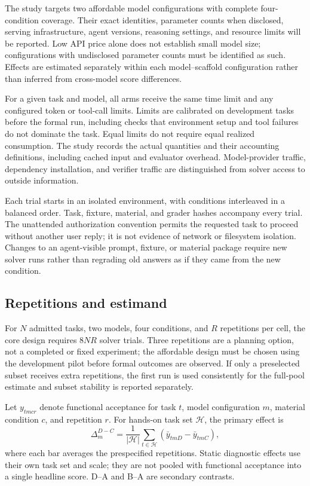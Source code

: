 \documentclass[11pt]{article}
\begin{document}
The study targets two affordable model configurations with complete four-condition coverage.
Their exact identities, parameter counts when disclosed, serving infrastructure, agent versions, reasoning settings, and resource limits will be reported.
Low API price alone does not establish small model size; configurations with undisclosed parameter counts must be identified as such.
Effects are estimated separately within each model--scaffold configuration rather than inferred from cross-model score differences.

For a given task and model, all arms receive the same time limit and any configured token or tool-call limits.
Limits are calibrated on development tasks before the formal run, including checks that environment setup and tool failures do not dominate the task.
Equal limits do not require equal realized consumption.
The study records the actual quantities and their accounting definitions, including cached input and evaluator overhead.
Model-provider traffic, dependency installation, and verifier traffic are distinguished from solver access to outside information.

Each trial starts in an isolated environment, with conditions interleaved in a balanced order.
Task, fixture, material, and grader hashes accompany every trial.
The unattended authorization convention permits the requested task to proceed without another user reply; it is not evidence of network or filesystem isolation.
Changes to an agent-visible prompt, fixture, or material package require new solver runs rather than regrading old answers as if they came from the new condition.

\subsection{Repetitions and estimand}
\label{sec:estimand}

For $N$ admitted tasks, two models, four conditions, and $R$ repetitions per cell, the core design requires $8NR$ solver trials.
Three repetitions are a planning option, not a completed or fixed experiment; the affordable design must be chosen using the development pilot before formal outcomes are observed.
If only a preselected subset receives extra repetitions, the first run is used consistently for the full-pool estimate and subset stability is reported separately.

Let $y_{tmcr}$ denote functional acceptance for task $t$, model configuration $m$, material condition $c$, and repetition $r$.
For hands-on task set $\mathcal{H}$, the primary effect is
\begin{equation}
\Delta_m^{D-C}=\frac{1}{|\mathcal{H}|}
\sum_{t\in\mathcal{H}}(\bar y_{tmD}-\bar y_{tmC}),
\label{eq:primary}
\end{equation}
where each bar averages the prespecified repetitions.
Static diagnostic effects use their own task set and scale; they are not pooled with functional acceptance into a single headline score.
D--A and B--A are secondary contrasts.
\end{document}
